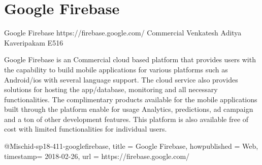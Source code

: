 \section{Google Firebase}

Google Firebase
https://firebase.google.com/
Commercial
Venkatesh Aditya Kaveripakam
E516

Google Firebase is an Commercial cloud based platform that provides users with
the capability to build mobile applications for various platforms such as
Android/ios with several language support. The cloud service also provides
solutions for hosting the app/database, monitoring and all necessary
functionalities. The complimentary products available for the mobile
applications built through the platform enable for usage Analytics, predictions,
 ad campaign and a ton of other development features. This platform is also
 available free of cost with limited functionalities for individual users.

@Misc{hid-sp18-411-googlefirebase,
title = {Google Firebase},
howpublished = {Web},
timestamp= {2018-02-26},
url = {https://firebase.google.com/}
}
